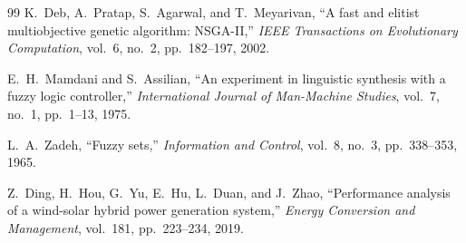 \documentclass[journal]{IEEEtran}
\begin{document}
\begin{thebibliography}{99}
K.\ Deb, A.\ Pratap, S.\ Agarwal, and T.\ Meyarivan, ``A fast and elitist multiobjective genetic algorithm: NSGA-II,'' \textit{IEEE Transactions on Evolutionary Computation}, vol.\ 6, no.\ 2, pp.\ 182--197, 2002.

E.\ H.\ Mamdani and S.\ Assilian, ``An experiment in linguistic synthesis with a fuzzy logic controller,'' \textit{International Journal of Man-Machine Studies}, vol.\ 7, no.\ 1, pp.\ 1--13, 1975.

L.\ A.\ Zadeh, ``Fuzzy sets,'' \textit{Information and Control}, vol.\ 8, no.\ 3, pp.\ 338--353, 1965.

Z.\ Ding, H.\ Hou, G.\ Yu, E.\ Hu, L.\ Duan, and J.\ Zhao, ``Performance analysis of a wind-solar hybrid power generation system,'' \textit{Energy Conversion and Management}, vol.\ 181, pp.\ 223--234, 2019.

\end{thebibliography}

\balance
\end{document}
